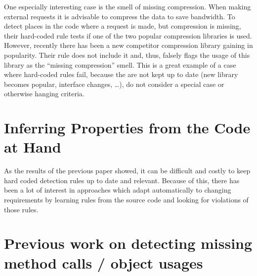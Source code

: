 One especially interesting case is the smell of missing compression.
When making external requests it is advisable to compress the data to save bandwidth.
To detect places in the code where a request is made, but compression is missing, their hard-coded rule tests if one of the two popular compression libraries is used.
However, recently there has been a new competitor compression library gaining in popularity.
Their rule does not include it and, thus, falsely flags the usage of this library as the ``missing compression'' smell.
This is a great example of a case where hard-coded rules fail, because the are not kept up to date (new library becomes popular, interface changes, \ldots), do not consider a special case or otherwise hanging criteria.

\section{Inferring Properties from the Code at Hand}

As the results of the previous paper showed, it can be difficult and costly to keep hard coded detection rules up to date and relevant.
Because of this, there has been a lot of interest in approaches which adapt automatically to changing requirements by learning rules from the source code and looking for violations of those rules.


\section{Previous work on detecting missing method calls / object usages}

